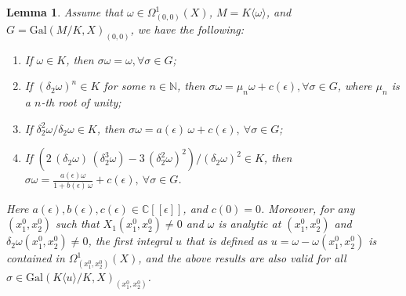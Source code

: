 \documentclass[preprint, 12pt]{elsarticle}
\newtheorem{lem}[thm]{Lemma}
\numberwithin{equation}{section}
\newcommand{\Comp}{\mathbb{C}}
\newcommand{\Gal}{\mathrm{Gal}}
\begin{document}
\begin{lem}
\label{le:2} Assume that $\omega\in \Omega_{(0,0)}^1(X)$, $M =
K\langle\omega\rangle$, and $G = \Gal(M/K,X)_{(0,0)}$, we have the
following:
\begin{enumerate}
\item[(1).] If $\omega\in K$, then $\sigma \omega = \omega, \forall
\sigma\in G$; 
\item[(2).] If $(\delta_2\omega)^n \in K$ for some $n\in
\mathbb{N}$, then $\sigma \omega = \mu_n\omega + c(\epsilon),
\forall \sigma\in G$, where $\mu_n$ is a $n$-th root of unity;
\item[(3).] If $\delta_2^2\omega/\delta_2\omega\in K$, then
$\sigma\omega = a(\epsilon)\,\omega + c(\epsilon),\ \forall
\sigma\in G$; 
\item[(4).] If $(2\,(\delta_2\omega)\,(\delta_2^3\omega) -
3\,(\delta_2^2\omega)^2)/(\delta_2\omega)^2\in K$, then
$\sigma\omega = \frac{a(\epsilon)\omega}{1 + b(\epsilon)\,\omega}
+ c(\epsilon),\ \forall \sigma\in G$.
\end{enumerate}
Here $a(\epsilon), b(\epsilon), c(\epsilon)\in
\Comp[[\epsilon]]$, and $c(0) = 0$. Moreover,
for any $(x_1^0, x_2^0)$ such that $X_1(x_1^0, x_2^0)\not=0$ and
$\omega$ is analytic at $(x_1^0, x_2^0)$ and
$\delta_2\omega(x_1^0, x_2^0)\not=0$, the first integral $u$ that is
defined as $u = \omega - \omega(x_1^0, x_2^0)$ is contained in $
\Omega_{(x_1^0, x_2^0)}^1(X)$, and the above results are also
valid for all $\sigma\in \Gal(K\langle u\rangle/K,X)_{(x_1^0,
x_2^0)}$.
\end{lem}
\end{document}
